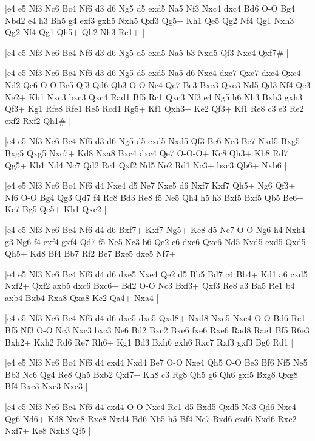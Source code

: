 \whitename{}
\blackname{}
\makegametitle
|e4 e5 Nf3 Nc6 Bc4 Nf6 d3 d6 Ng5 d5 exd5 Na5 Nf3 Nxc4 dxc4 Bd6 O-O Bg4 Nbd2 e4 h3 Bh5 g4 exf3 gxh5 Nxh5 Qxf3 Qg5+ Kh1 Qe5 Qg2 Nf4 Qg1 Nxh3 Qg2 Nf4 Qg1 Qh5+ Qh2 Nh3 Re1+  |

\whitename{}
\blackname{}
\makegametitle
|e4 e5 Nf3 Nc6 Bc4 Nf6 d3 d6 Ng5 d5 exd5 Na5 b3 Nxd5 Qf3 Nxc4 Qxf7\#  |

\whitename{}
\blackname{}
\makegametitle
|e4 e5 Nf3 Nc6 Bc4 Nf6 d3 d6 Ng5 d5 exd5 Na5 d6 Nxc4 dxc7 Qxc7 dxc4 Qxc4 Nd2 Qc6 O-O Bc5 Qf3 Qd6 Qb3 O-O Nc4 Qc7 Be3 Bxe3 Qxe3 Nd5 Qd3 Nf4 Qc3 Ne2+ Kh1 Nxc3 bxc3 Qxc4 Rad1 Bf5 Rc1 Qxc3 Nf3 e4 Ng5 h6 Nh3 Bxh3 gxh3 Qf3+ Kg1 Rfe8 Rfe1 Re5 Rcd1 Rg5+ Kf1 Qxh3+ Ke2 Qf3+ Kf1 Re8 c3 e3 Re2 exf2 Rxf2 Qh1\#  |

\whitename{}
\blackname{}
\makegametitle
|e4 e5 Nf3 Nc6 Bc4 Nf6 d3 d6 Ng5 d5 exd5 Nxd5 Qf3 Be6 Nc3 Be7 Nxd5 Bxg5 Bxg5 Qxg5 Nxc7+ Kd8 Nxa8 Bxc4 dxc4 Qe7 O-O-O+ Kc8 Qh3+ Kb8 Rd7 Qg5+ Kb1 Nd4 Nc7 Qd2 Rc1 Qxf2 Nd5 Ne2 Rd1 Nc3+ bxc3 Qb6+ Nxb6  |

\whitename{}
\blackname{}
\makegametitle
|e4 e5 Nf3 Nc6 Bc4 Nf6 d4 Nxe4 d5 Ne7 Nxe5 d6 Nxf7 Kxf7 Qh5+ Ng6 Qf3+ Nf6 O-O Bg4 Qg3 Qd7 f4 Rc8 Bd3 Re8 f5 Ne5 Qh4 h5 h3 Bxf5 Bxf5 Qb5 Be6+ Ke7 Bg5 Qc5+ Kh1 Qxc2  |

\whitename{}
\blackname{}
\makegametitle
|e4 e5 Nf3 Nc6 Bc4 Nf6 d4 d6 Bxf7+ Kxf7 Ng5+ Ke8 d5 Ne7 O-O Ng6 h4 Nxh4 g3 Ng6 f4 exf4 gxf4 Qd7 f5 Ne5 Nc3 b6 Qe2 c6 dxc6 Qxc6 Nd5 Nxd5 exd5 Qxd5 Qh5+ Kd8 Bf4 Bb7 Rf2 Be7 Bxe5 dxe5 Nf7+  |

\whitename{}
\blackname{}
\makegametitle
|e4 e5 Nf3 Nc6 Bc4 Nf6 d4 d6 dxe5 Nxe4 Qe2 d5 Bb5 Bd7 c4 Bb4+ Kd1 a6 cxd5 Nxf2+ Qxf2 axb5 dxc6 Bxc6+ Bd2 O-O Nc3 Bxf3+ Qxf3 Re8 a3 Ba5 Re1 b4 axb4 Bxb4 Rxa8 Qxa8 Kc2 Qa4+ Nxa4  |

\whitename{}
\blackname{}
\makegametitle
|e4 e5 Nf3 Nc6 Bc4 Nf6 d4 d6 dxe5 dxe5 Qxd8+ Nxd8 Nxe5 Nxe4 O-O Bd6 Re1 Bf5 Nf3 O-O Nc3 Nxc3 bxc3 Ne6 Bd2 Bxc2 Bxe6 fxe6 Rxe6 Rad8 Rae1 Bf5 R6e3 Bxh2+ Kxh2 Rd6 Re7 Rh6+ Kg1 Bd3 Bxh6 gxh6 Rxc7 Rxf3 gxf3 Bg6 Rd1  |

\whitename{}
\blackname{}
\makegametitle
|e4 e5 Nf3 Nc6 Bc4 Nf6 d4 exd4 Nxd4 Be7 O-O Nxe4 Qh5 O-O Be3 Bf6 Nf5 Ne5 Bb3 Nc6 Qg4 Re8 Qh5 Bxb2 Qxf7+ Kh8 c3 Rg8 Qh5 g6 Qh6 gxf5 Bxg8 Qxg8 Bf4 Bxc3 Nxc3 Nxc3  |

\whitename{}
\blackname{}
\makegametitle
|e4 e5 Nf3 Nc6 Bc4 Nf6 d4 exd4 O-O Nxe4 Re1 d5 Bxd5 Qxd5 Nc3 Qd6 Nxe4 Qg6 Nd6+ Kd8 Nxc8 Rxc8 Nxd4 Bd6 Nb5 h5 Bf4 Ne7 Bxd6 cxd6 Nxd6 Rxc2 Nxf7+ Ke8 Nxh8 Qf5  |

